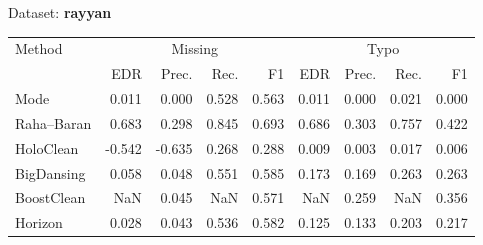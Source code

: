 \begin{subtable}[t]{0.492\linewidth}
\caption{Dataset: \textbf{rayyan}}
\label{tab:q1-acc-rayyan}
\centering
\begin{tabular}{lrrrrrrrr}
\toprule
\multirow{2}{*}{Method} &\multicolumn{4}{c}{Missing} &\multicolumn{4}{c}{Typo}\\
\cmidrule(lr){2-5}\cmidrule(l){6-9}
 & EDR & Prec. & Rec. & F1 & EDR & Prec. & Rec. & F1\\
\midrule
\midrule
Mode & 0.011 & 0.000 & 0.528 & 0.563 & 0.011 & 0.000 & 0.021 & 0.000 \\
Raha–Baran & 0.683 & 0.298 & 0.845 & 0.693 & 0.686 & 0.303 & 0.757 & 0.422 \\
HoloClean & -0.542 & -0.635 & 0.268 & 0.288 & 0.009 & 0.003 & 0.017 & 0.006 \\
BigDansing & 0.058 & 0.048 & 0.551 & 0.585 & 0.173 & 0.169 & 0.263 & 0.263 \\
BoostClean & NaN & 0.045 & NaN & 0.571 & NaN & 0.259 & NaN & 0.356 \\
Horizon & 0.028 & 0.043 & 0.536 & 0.582 & 0.125 & 0.133 & 0.203 & 0.217 \\
\bottomrule
\bottomrule
\end{tabular}
\end{subtable}